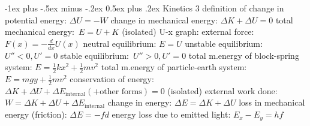 \documentclass[10pt,landscape]{article}
\makeatletter
\renewcommand{\subsection}{\@startsection{subsection}{2}{0mm}%
                                {-1ex plus -.5ex minus -.2ex}%
                                {0.5ex plus .2ex}%
                                {\normalfont\normalsize\bfseries}}
\makeatother
\begin{document}
\begin{multicols*}{3}
\subsection{Kinetics 3}
definition of change in potential energy: $\Delta U=-W$
\newline
change in mechanical energy: $\Delta K+\Delta U=0$
\newline
total mechanical energy: $E=U+K$ (isolated)
\newline \newline
U-x graph:
\newline
external force: $F(x)=-\frac{d}{dx}U(x)$
\newline
neutral equilibrium: $E=U$
\newline
unstable equilibrium: $U''< 0, U'=0$
\newline
stable equilibrium: $U''> 0, U'=0$
\newline \newline
total m.energy of block-spring system: $E=\frac{1}{2}kx^2+\frac{1}{2}mv^2$
\newline
total m.energy of particle-earth system: $E=mgy+\frac{1}{2}mv^2$
\newline
conservation of energy: $\Delta K+\Delta U+\Delta E_{\textrm{internal}}\left ( + \textrm{other forms} \right )=0$ (isolated)
\newline
external work done: $W=\Delta K+\Delta U+\Delta E_{\textrm{internal}}$
\newline
change in energy: $\Delta E=\Delta K+\Delta U$
\newline
loss in mechanical energy (friction): $\Delta E=-fd$
\newline
energy loss due to emitted light: $E_x-E_y=hf$


\end{multicols*}
\end{document}
